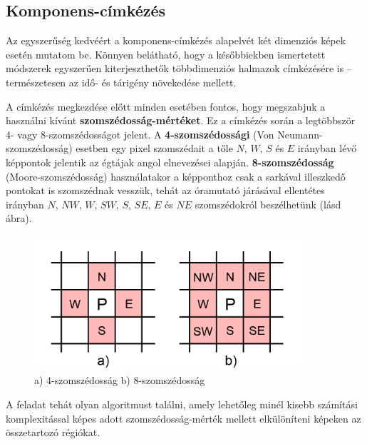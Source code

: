 \subsection{Komponens-címkézés}\label{sect:blob_cimke}

Az egyszerűség kedvéért a komponens-címkézés alapelvét két dimenziós képek esetén mutatom be. Könnyen belátható, hogy a későbbiekben ismertetett módszerek egyszerűen kiterjeszthetők többdimenziós halmazok címkézésére is -- természetesen az idő- és tárigény növekedése mellett.

\bigskip

A címkézés megkezdése előtt minden esetében fontos, hogy megszabjuk a használni kívánt \textbf{szomszédosság-mértéket}. Ez a címkézés során a legtöbbször 4- vagy 8-szomszédosságot jelent. A \textbf{4-szomszédossági} (Von Neumann-szomszédosság) esetben egy pixel szomszédait a tőle $N$, $W$, $S$ és $E$ irányban lévő képpontok jelentik az égtájak angol elnevezései alapján. \textbf{8-szomszédosság} (Moore-szomszédosság) használatakor a képponthoz csak a sarkával illeszkedő pontokat is szomszédnak vesszük, tehát az óramutató járásával ellentétes irányban $N$, $NW$, $W$, $SW$, $S$, $SE$, $E$ és $NE$ szomszédokról beszélhetünk (lásd  ábra).

\begin{figure}[!ht]
\centering
\includegraphics[width=100mm, keepaspectratio]{figures/connectivity.png}
\caption{a) 4-szomszédosság b) 8-szomszédosság}
\label{fig:connectivity}
\end{figure}

A feladat tehát olyan algoritmust találni, amely lehetőleg minél kisebb számítási komplexitással képes adott szomszédosság-mérték mellett elkülöníteni képeken az összetartozó régiókat.

